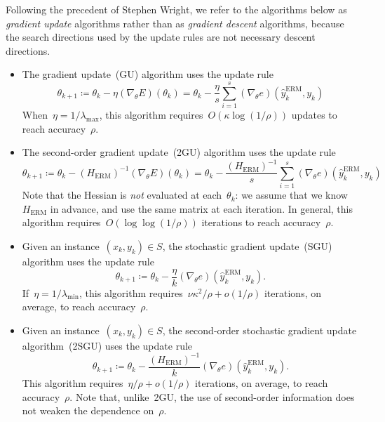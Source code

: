 \documentclass[11pt,a4paper]{article}
\numberwithin{equation}{section}
\begin{document}
Following the precedent of Stephen Wright, we refer to the algorithms below as
\emph{gradient update} algorithms rather than as \emph{gradient descent}
algorithms, because the search directions used by the update rules are not
necessary descent directions.
\begin{itemize} 
\item The gradient update~(GU) algorithm uses the update rule
\[
	\theta_{k + 1}
	\coloneqq \theta_k - \eta (\nabla_\theta E)(\theta_k)
	= \theta_k - \frac{\eta}{s} \sum_{i = 1}^s
		(\nabla_\theta e)(\hat{y}_k^{\text{ERM}}, y_k)
\]
When~$\eta = 1/\lambda_{\text{max}}$, this algorithm requires~$O(\kappa \log(1 /
\rho))$ updates to reach accuracy~$\rho$.

\item The second-order gradient update~(2GU) algorithm uses the update rule
\[
	\theta_{k + 1}
	\coloneqq \theta_k - (H_{\text{ERM}})^{-1} (\nabla_\theta E)(\theta_k)
	= \theta_k - \frac{(H_{\text{ERM}})^{-1}}{s} \sum_{i = 1}^s
		(\nabla_\theta e)(\hat{y}_k^{\text{ERM}}, y_k)
\]
Note that the Hessian is \emph{not} evaluated at each~$\theta_k$: we assume that
we know~$H_{\text{ERM}}$ in advance, and use the same matrix at each iteration.
In general, this algorithm requires~$O(\log\log(1 / \rho))$ iterations to reach
accuracy~$\rho$.

\item Given an instance~$(x_k, y_k) \in S$, the stochastic gradient update~(SGU)
algorithm uses the update rule
\[
	\theta_{k + 1}
	\coloneqq \theta_k - \frac{\eta}{k}
		(\nabla_\theta e)(\hat{y}_k^{\text{ERM}}, y_k).
\]
If~$\eta = 1/\lambda_{\text{min}}$, this algorithm requires~$\nu \kappa^2 / \rho
+ o(1 / \rho)$ iterations, on average, to reach accuracy~$\rho$.

\item Given an instance~$(x_k, y_k) \in S$, the second-order stochastic gradient
update algorithm~(2SGU) uses the update rule
\[
	\theta_{k + 1}
	\coloneqq \theta_k - \frac{(H_{\text{ERM}})^{-1}}{k}
		(\nabla_\theta e)(\hat{y}_k^{\text{ERM}}, y_k).
\]
This algorithm requires~$\eta / \rho + o(1 / \rho)$ iterations, on average, to
reach accuracy~$\rho$. Note that, unlike~2GU, the use of second-order
information does not weaken the dependence on~$\rho$.
\end{itemize}
\end{document}
